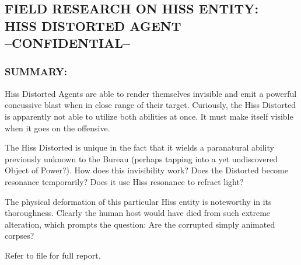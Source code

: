 \subsection*{FIELD RESEARCH ON HISS ENTITY:\\
	HISS DISTORTED AGENT\\
	--CONFIDENTIAL--}
\subsubsection*{SUMMARY:}
\par Hiss Distorted Agents are able to render
themselves invisible and emit a powerful
concussive blast when in close range of
their target. Curiously, the Hiss Distorted
is apparently not able to utilize both
abilities at once. It must make itself
visible when it goes on the offensive.

\par The Hiss Distorted is unique in the fact that it wields a paranatural
ability previously unknown to the Bureau (perhaps tapping into a
yet undiscovered Object of Power?). How does this invisibility
work? Does the Distorted become resonance temporarily? Does
it use Hiss resonance to refract light?
\par The physical deformation of this particular Hiss entity is
noteworthy in its thoroughness. Clearly the human host would
have died from such extreme alteration, which prompts the
question: Are the corrupted simply animated corpses?
\par Refer to file  for full report.